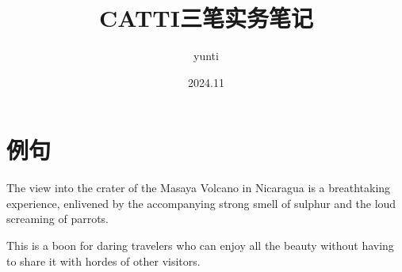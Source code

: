 \documentclass{article}
\title{CATTI三笔实务笔记}
\author{yunti}
\date{2024.11}
\begin{document}
\tableofcontents

\section{例句}
The view into the crater of the Masaya Volcano in Nicaragua is a breathtaking experience, enlivened by the accompanying strong smell of sulphur and the loud screaming of parrots.

This is a boon for daring travelers who can enjoy all the beauty without having to share it with hordes of other visitors.

\maketitle
\end{document}
